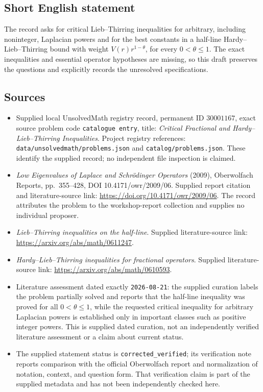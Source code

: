\documentclass[11pt]{article}
\begin{document}
\subsection{Short English statement}
The record asks for critical Lieb--Thirring inequalities for arbitrary, including noninteger, Laplacian powers and for the best constants in a half-line Hardy--Lieb--Thirring bound with weight \(V(r)r^{1-\theta}\), for every \(0<\theta\leq1\). The exact inequalities and essential operator hypotheses are missing, so this draft preserves the questions and explicitly records the unresolved specifications.
\subsection{Sources}
\begin{itemize}
\item Supplied local UnsolvedMath registry record, permanent ID \(30001167\), exact source problem code \texttt{catalogue entry}, title: \emph{Critical Fractional and Hardy--Lieb--Thirring Inequalities}. Project registry references: \texttt{data/unsolvedmath/problems.json} and \texttt{catalog/problems.json}. These identify the supplied record; no independent file inspection is claimed.
\item \emph{Low Eigenvalues of Laplace and Schrödinger Operators} (2009), Oberwolfach Reports, pp.\ 355--428, DOI 10.4171/owr/2009/06. Supplied report citation and literature-source link: \url{https://doi.org/10.4171/owr/2009/06}. The record attributes the problem to the workshop-report collection and supplies no individual proposer.
\item \emph{Lieb--Thirring inequalities on the half-line}. Supplied literature-source link: \url{https://arxiv.org/abs/math/0611247}.
\item \emph{Hardy--Lieb--Thirring inequalities for fractional operators}. Supplied literature-source link: \url{https://arxiv.org/abs/math/0610593}.
\item Literature assessment dated exactly \texttt{2026-08-21}: the supplied curation labels the problem partially solved and reports that the half-line inequality was proved for all \(0<\theta\leq1\), while the requested critical inequality for arbitrary Laplacian powers is established only in important classes such as positive integer powers. This is supplied dated curation, not an independently verified literature assessment or a claim about current status.
\item The supplied statement status is \texttt{corrected\_verified}; its verification note reports comparison with the official Oberwolfach report and normalization of notation, context, and question form. That verification claim is part of the supplied metadata and has not been independently checked here.
\end{itemize}
\end{document}
